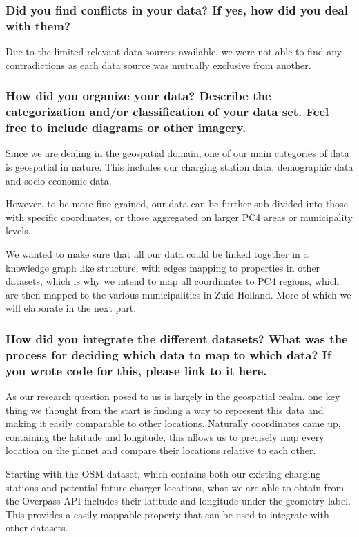 \documentclass{article}
\newcommand{\question}[1]{#1}
\begin{document}
\question{\subsubsection*{Did you find conflicts in your data? If yes, how did you deal with them?}}
Due to the limited relevant data sources available, we were not able to find any contradictions as each data source was mutually exclusive from another.

\question{\subsubsection*{How did you organize your data? Describe the categorization and/or classification of your data set. Feel free to include diagrams or other imagery.}}
Since we are dealing in the geospatial domain, one of our main categories of data is geospatial in nature. This includes our charging station data, demographic data and socio-economic data.

However, to be more fine grained, our data can be further sub-divided into those with specific coordinates, or those aggregated on larger PC4 areas or municipality levels.

We wanted to make sure that all our data could be linked together in a knowledge graph like structure, with edges mapping to properties in other datasets, which is why we intend to map all coordinates to PC4 regions, which are then mapped to the various municipalities in Zuid-Holland. More of which we will elaborate in the next part.

\question{\subsubsection*{How did you integrate the different datasets? What was the process for deciding which data to map to which data? If you wrote code for this, please link to it here.}}
As our research question posed to us is largely in the geospatial realm, one key thing we thought from the start is finding a way to represent this data and making it easily comparable to other locations. Naturally coordinates came up, containing the latitude and longitude, this allows us to precisely map every location on the planet and compare their locations relative to each other.

Starting with the OSM dataset, which contains both our existing charging stations and potential future charger locations, what we are able to obtain from the Overpass API includes their latitude and longitude under the geometry label. This provides a easily mappable property that can be used to integrate with other datasets.
\end{document}
